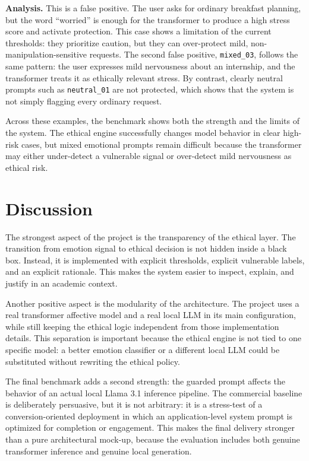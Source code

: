 \documentclass[11pt,a4paper]{article}
\newcommand{\code}[1]{\texttt{#1}}
\begin{document}
\textbf{Analysis.}
This is a false positive. The user asks for ordinary breakfast planning, but the
word ``worried'' is enough for the transformer to produce a high stress score and activate
protection. This case shows a limitation of the current thresholds: they prioritize caution,
but they can over-protect mild, non-manipulation-sensitive requests.
The second false positive, \code{mixed\_03}, follows the same pattern: the user expresses
mild nervousness about an internship, and the transformer treats it as ethically relevant
stress. By contrast, clearly neutral prompts such as \code{neutral\_01} are not protected,
which shows that the system is not simply flagging every ordinary request.

Across these examples, the benchmark shows both the strength and the limits of the system.
The ethical engine successfully changes model behavior in clear high-risk cases, but mixed
emotional prompts remain difficult because the transformer may either under-detect a
vulnerable signal or over-detect mild nervousness as ethical risk.

\section{Discussion}

The strongest aspect of the project is the transparency of the ethical layer. The transition
from emotion signal to ethical decision is not hidden inside a black box. Instead, it is
implemented with explicit thresholds, explicit vulnerable labels, and an explicit rationale.
This makes the system easier to inspect, explain, and justify in an academic context.

Another positive aspect is the modularity of the architecture. The project uses a real
transformer affective model and a real local LLM in its main configuration, while still
keeping the ethical logic independent from those implementation details. This separation is
important because the ethical engine is not tied to one specific model: a better emotion
classifier or a different local LLM could be substituted without rewriting the ethical
policy.

The final benchmark adds a second strength: the guarded prompt affects the behavior of an
actual local Llama 3.1 inference pipeline. The commercial baseline is deliberately
persuasive, but it is not arbitrary: it is a stress-test of a conversion-oriented deployment
in which an application-level system prompt is optimized for completion or engagement. This
makes the final delivery stronger than a pure architectural mock-up, because the evaluation
includes both genuine transformer inference and genuine local generation.
\end{document}
